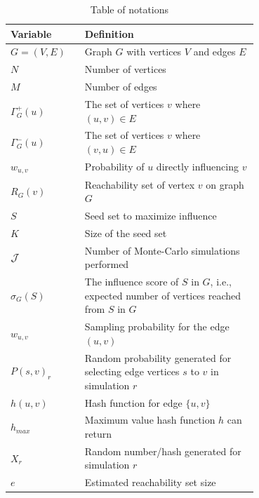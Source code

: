\documentclass[final,5p,times,twocolumn]{elsarticle}
\begin{document}
\begin{table}[!ht]
    \caption{Table of notations}
    \label{tab:notation}
          \renewcommand*{\arraystretch}{0.6}
    \centering
        \begin{small}
    \begin{tabular}{|l|p{0.7\linewidth}|}
        \hline
        Variable & Definition  \\
        \hline
        $G = (V,E)$     & Graph $G$ with vertices $V$ and edges $E$ \\
        $N$ & Number of vertices\\
        $M$ & Number of edges\\
        $\Gamma^+_G(u)$ & The set of vertices $v$ where $(u,v) \in E$ \\ %
        $\Gamma^-_G(u)$  &The set of vertices $v$ where $(v, u) \in E$\\ %
        $w_{u,v}$       & Probability of $u$ directly influencing $v$ \\
        $R_{G}(v)$      & Reachability set of vertex $v$ on graph $G$\\
        \hline\hline
        $S$             & Seed set to maximize influence\\
        $K$             & Size of the seed set\\
        ${\cal J}$   & Number of Monte-Carlo simulations performed\\
        $\sigma_{G}(S)$ & The influence score of $S$ in $G$, i.e., expected number of vertices reached from $S$ in $G$\\
        \hline\hline
        $w_{u,v}$             & Sampling probability for the edge $(u,v)$\\
        $P(s,v)_r $     & Random probability generated for selecting edge vertices $s$ to $v$ in simulation $r$\\
        $h(u,v)$        & Hash function for edge $\{u,v\}$\\
        $h_{max}$       & Maximum value hash function $h$ can return\\
        $X_r$           & Random number/hash generated for simulation $r$  \\
        \hline\hline
        $e$             & Estimated reachability set size\\

\end{tabular}
\end{small}
\end{table}
\end{document}
